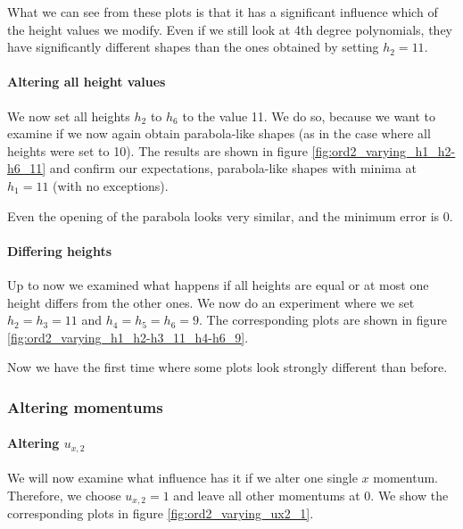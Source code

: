 \documentclass{article}
\begin{document}
What we can see from these plots is that it has a significant influence which of the height values we modify. Even if we still look at 4th degree polynomials, they have significantly different shapes than the ones obtained by setting $h_2=11$.

\paragraph{Altering all height values}

We now set all heights $h_2$ to $h_6$ to the value 11. We do so, because we want to examine if we now again obtain parabola-like shapes (as in the case where all heights were set to 10). The results are shown in figure \ref{fig:ord2_varying_h1_h2-h6_11} and confirm our expectations, parabola-like shapes with minima at $h_1=11$ (with no exceptions).



Even the opening of the parabola looks very similar, and the minimum error is 0.

\paragraph{Differing heights}

Up to now we examined what happens if all heights are equal or at most one height differs from the other ones. We now do an experiment where we set $h_2=h_3=11$ and $h_4=h_5=h_6=9$. The corresponding plots are shown in figure \ref{fig:ord2_varying_h1_h2-h3_11_h4-h6_9}.



Now we have the first time where some plots look strongly different than before.

\clearpage{}

\subsubsection{Altering momentums}
\label{sec:stiffness-analysis-ord2-altering-momentums}

\paragraph{\texorpdfstring{Altering $u_{x,2}$}{Altering ux2}}

We will now examine what influence has it if we alter one single $x$ momentum. Therefore, we choose $u_{x,2}=1$ and leave all other momentums at 0. We show the corresponding plots in figure \ref{fig:ord2_varying_ux2_1}.
\end{document}
